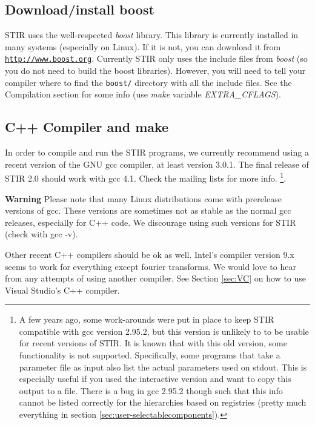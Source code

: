 \documentclass{article}
\def\R2Lurl#1#2{\mbox{\href{#1}{\tt #2}}}
\begin{document}
\subsection{Download/install boost}
STIR uses the well-respected \textit{boost} library. This library
is currently installed in many systems (especially on Linux). If it
is not, you can download it from 
\R2Lurl{http://www.boost.org}{http://www.boost.org}. Currently STIR only
uses the include files from \textit{boost} (so you do not need to build
the boost libraries). However, you will need to tell your compiler
where to find the \texttt{boost/} directory with all the include files.
See the Compilation section for some info (use \textit{make} variable 
\textit{EXTRA\_CFLAGS}).

\subsection{
C++ Compiler and make}

In order to compile and run the STIR programs, we currently recommend 
using a recent version of the GNU gcc compiler, at least version 
3.0.1. The final release of STIR 2.0 should work with gcc 4.1.
Check the mailing lists for more info.
\footnote{{\small A few years ago, some work-arounds were put in place to 
keep STIR compatible with gcc version 2.95.2, but this version is unlikely to
to be usable for recent versions of STIR. It is known that with this
old version, some functionality is not supported. Specifically, 
some programs that take a parameter file as input also list the 
actual parameters used on stdout. This is especially useful if 
you used the interactive version and want to copy this output 
to a file. There is a bug in gcc 2.95.2 though such that this 
info cannot be listed correctly for the hierarchies based on 
registries (pretty much everything in section 
\ref{sec:user-selectablecomponents}).}}. 


\textbf{Warning} Please note that many Linux distributions come with 
prerelease versions of gcc. These versions are sometimes not as stable
as the normal gcc releases, especially for C++ code.
We discourage using such versions for STIR (check with gcc -v).



Other recent C++ compilers should be ok as well. Intel's compiler
version 9.x seems to work for everything except fourier transforms.
We would love 
to hear from any attempts of using another compiler. See Section 
\ref{sec:VC}
on how to use Visual Studio's C++ compiler.
\end{document}
